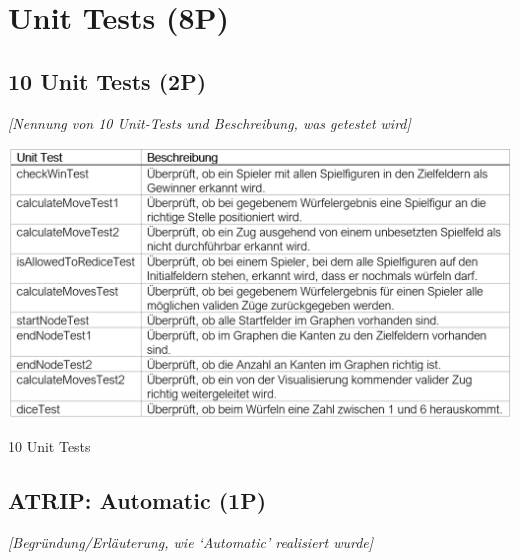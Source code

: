 
\titlespacing*{\chapter}{0pt}{-30mm}{10pt}
  
\chapter{Unit Tests (8P)}
\pagestyle{scrheadings}
\clearscrheadfoot
{}
\setcounter{page}{22}
\ofoot[\pagemark]{\pagemark}
\onehalfspacing

\section{10 Unit Tests (2P)}
\emph{[Nennung von 10 Unit-Tests und Beschreibung, was getestet wird]}

\begin{table}[htbp]
\centering
\centerline{\includegraphics[scale=.55]{unitteststable}}
\caption{10 Unit Tests}
\label{tab:unitteststable}
\end{table}

\section{ATRIP: Automatic (1P)}
\emph{[Begründung/Erläuterung, wie ‘Automatic’ realisiert wurde]}
\vspace{.4cm}

